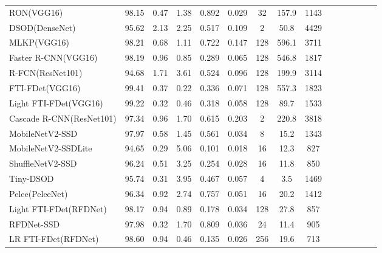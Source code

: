 \begin{table*}[!t]
{\begin{tabular}{lccccccccccccccc}
			RON(VGG16)                  & 98.15   & 0.47   & 1.38   & 0.892 & 0.029 & 32  & 157.9 & \multicolumn{2}{c}{1143} \\
			DSOD(DenseNet)              & 95.62   & 2.13   & 2.25   & 0.517 & 0.109 & 2   & 50.8  & \multicolumn{2}{c}{4429} \\
			\midrule
			MLKP(VGG16)                 & 98.21   & 0.68   & 1.11   & 0.722 & 0.147 & 128 & 596.1 & \multicolumn{2}{c}{3711} \\
			Faster R-CNN(VGG16)         & 98.19   & 0.96   & 0.85   & 0.289 & 0.065 & 128 & 546.8 & \multicolumn{2}{c}{1817} \\
			R-FCN(ResNet101)            & 94.68   & 1.71   & 3.61   & 0.524 & 0.096 & 128 & 199.9 & \multicolumn{2}{c}{3114} \\
			FTI-FDet(VGG16)             & 99.41   & 0.37   & 0.22   & 0.336 & 0.071 & 128 & 557.3 & \multicolumn{2}{c}{1823} \\
			Light FTI-FDet(VGG16)       & 99.22   & 0.32   & 0.46   & 0.318 & 0.058 & 128 & 89.7  & \multicolumn{2}{c}{1533} \\
            Cascade R-CNN(ResNet101)    & 97.34   & 0.96   & 1.70   & 0.615 & 0.203 & 2   & 220.8 & \multicolumn{2}{c}{3818} \\
			\midrule
			MobileNetV2-SSD             & 97.97   & 0.58   & 1.45   & 0.561 & 0.034 & 8   & 15.2  & \multicolumn{2}{c}{1343} \\
			MobileNetV2-SSDLite         & 94.65   & 0.29   & 5.06   & 0.101 & 0.018 & 16  & 12.3  & \multicolumn{2}{c}{827}  \\
			ShuffleNetV2-SSD            & 96.24   & 0.51   & 3.25   & 0.254 & 0.028 & 16  & 11.8  & \multicolumn{2}{c}{850}  \\
			Tiny-DSOD                   & 95.74   & 0.31   & 3.95   & 0.467 & 0.057 & 4   & 3.5   & \multicolumn{2}{c}{1469} \\
			Pelee(PeleeNet)             & 96.34   & 0.92   & 2.74   & 0.757 & 0.051 & 16  & 20.2  & \multicolumn{2}{c}{1412} \\
			\midrule
            Light FTI-FDet(RFDNet)      & 98.17   & 0.94   & 0.89   & 0.178 & 0.034 & 128 & 27.8  & \multicolumn{2}{c}{857}  \\
			RFDNet-SSD                  & 97.98   & 0.32   & 1.70   & 0.809 & 0.036 & 24  & 11.4  & \multicolumn{2}{c}{905}  \\
			LR FTI-FDet(RFDNet)         & 98.60   & 0.94   & 0.46   & 0.135 & 0.026 & 256 & 19.6  & \multicolumn{2}{c}{713}  \\
			\bottomrule
	\end{tabular}}
	\label{meanaccuray}
\end{table*}


